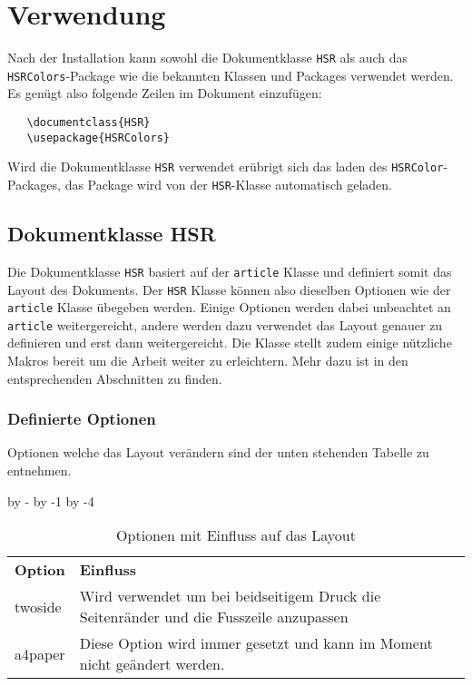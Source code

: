 \section{Verwendung}
 Nach der Installation kann sowohl die Dokumentklasse \verb+HSR+ als auch das \verb+HSRColors+-Package wie die bekannten Klassen und Packages
 verwendet werden.
 Es genügt also folgende Zeilen im Dokument einzufügen:
 \begin{verbatim}
   \documentclass{HSR}
   \usepackage{HSRColors}
 \end{verbatim}
 Wird die Dokumentklasse \verb+HSR+ verwendet erübrigt sich das laden des \verb+HSRColor+-Packages, das Package wird von der \verb+HSR+-Klasse
 automatisch geladen.


\subsection{Dokumentklasse HSR}
Die Dokumentklasse \verb+HSR+ basiert auf der \verb+article+ Klasse und definiert somit das Layout des Dokuments. Der \verb+HSR+ Klasse können also
dieselben Optionen wie der \verb+article+ Klasse übegeben werden. Einige Optionen werden dabei unbeachtet an \verb+article+ weitergereicht, andere
werden dazu verwendet das Layout genauer zu definieren und erst dann weitergereicht. Die Klasse stellt zudem einige nützliche Makros bereit um die
Arbeit weiter zu erleichtern. Mehr dazu ist in den entsprechenden Abschnitten zu finden.

\subsubsection{Definierte Optionen}
Optionen welche das Layout verändern sind der unten stehenden Tabelle zu entnehmen.

\settowidth{\ci}{a4paper}
\setlength{\cii}{\textwidth}
\advance\cii by -\ci
\advance\cii by -1\arrayrulewidth
\advance\cii by -4\tabcolsep

\begin{table}[!hb]
\centering
{}
\begin{tabular}{p{\ci}|p{\cii}}
	\rowcolor{HSRLakeGreen40}
	\textbf{Option} & \textbf{Einfluss}
	\\
	twoside & Wird verwendet um bei beidseitigem Druck die Seitenränder und die Fusszeile anzupassen
	\\
	a4paper & Diese Option wird immer gesetzt und kann im Moment nicht geändert werden.
\end{tabular}
\caption{Optionen mit Einfluss auf das Layout}
\label{tab:DokKlasseHSR:Optionen}
\end{table}

